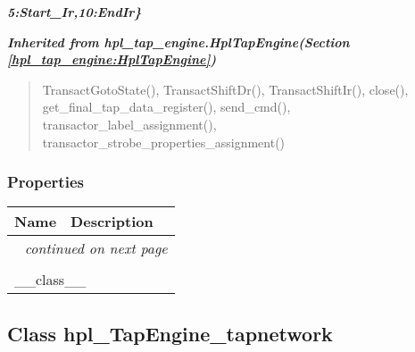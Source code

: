 \large{\textbf{\textit{5:Start\_Ir,10:EndIr\}}}}


\large{\textbf{\textit{Inherited from hpl\_tap\_engine.HplTapEngine\textit{(Section \ref{hpl_tap_engine:HplTapEngine})}}}}

\begin{quote}
TransactGotoState(), TransactShiftDr(), TransactShiftIr(), close(), get\_final\_tap\_data\_register(), send\_cmd(), transactor\_label\_assignment(), transactor\_strobe\_properties\_assignment()
\end{quote}


  \subsubsection{Properties}

    \vspace{-1cm}
\hspace{\varindent}\begin{longtable}{|p{\varnamewidth}|p{\vardescrwidth}|l}
\cline{1-2}
\cline{1-2} \centering \textbf{Name} & \centering \textbf{Description}& \\
\cline{1-2}
\endhead\cline{1-2}\multicolumn{3}{r}{\small\textit{continued on next page}}\\\endfoot\cline{1-2}
\endlastfoot\multicolumn{2}{|l|}{\textit{Inherited from object}}\\
\multicolumn{2}{|p{\varwidth}|}{\raggedright \_\_class\_\_}\\
\cline{1-2}
\end{longtable}



\subsection{Class hpl\_TapEngine\_tapnetwork}

